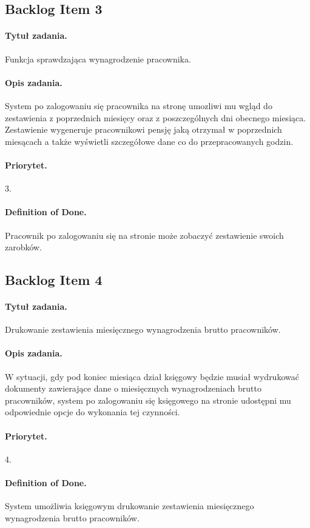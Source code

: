 \documentclass[a4paper]{article}
\begin{document}
\subsection{Backlog Item 3}
\paragraph{Tytuł zadania.} Funkcja sprawdzająca wynagrodzenie pracownika.
\paragraph{Opis zadania.} System po zalogowaniu się pracownika na stronę umozliwi mu wgląd do zestawienia z poprzednich miesięcy oraz z poszczególnych dni obecnego miesiąca. Zestawienie wygeneruje pracownikowi pensję jaką otrzymał w poprzednich miesącach a także wyświetli szczegółowe dane co do przepracowanych godzin.
\paragraph{Priorytet.} 3.
\paragraph{Definition of Done.} Pracownik po zalogowaniu się na stronie może zobaczyć zestawienie swoich zarobków.

\subsection{Backlog Item 4}
\paragraph{Tytuł zadania.} Drukowanie zestawienia miesięcznego wynagrodzenia brutto pracowników.
\paragraph{Opis zadania.} W sytuacji, gdy pod koniec miesiąca dział księgowy będzie musiał wydrukować dokumenty zawierające dane o miesięcznych wynagrodzeniach brutto pracowników, system po zalogowaniu się księgowego na stronie udostępni mu odpowiednie opcje do wykonania tej czynności.
\paragraph{Priorytet.} 4.
\paragraph{Definition of Done.} System umożliwia księgowym drukowanie zestawienia miesięcznego wynagrodzenia brutto pracowników.
\end{document}
